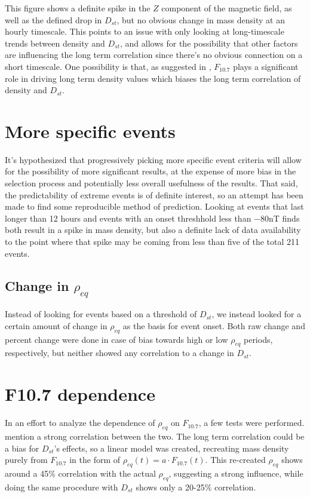 \documentclass[10pt,twocolumn]{article}
\begin{document}
This figure shows a definite spike in the $Z$ component of the magnetic field, as well as the defined drop in $D_{st}$, but no obvious change in mass density at an hourly timescale. This points to an issue with only looking at long-timescale trends between density and $D_{st}$, and allows for the possibility that other factors are influencing the long term correlation since there's no obvious connection on a short timescale. One possibility is that, as suggested in \cite{Takahashi2010}, $F_{10.7}$ plays a significant role in driving long term density values which biases the long term correlation of density and $D_{st}$.

\section{More specific events}
It's hypothesized that progressively picking more specific event criteria will allow for the possibility of more significant results, at the expense of more bias in the selection process and potentially less overall usefulness of the results. That said, the predictability of extreme events is of definite interest, so an attempt has been made to find some reproducible method of prediction. Looking at events that last longer than 12 hours and events with an onset threshhold less than $-80$nT finds both result in a spike in mass density, but also a definite lack of data availability to the point where that spike may be coming from less than five of the total 211 events. 

\subsection{Change in $\rho_{eq}$}
Instead of looking for events based on a threshold of $D_{st}$, we instead looked for a certain amount of change in $\rho_{eq}$ as the basis for event onset. Both raw change and percent change were done in case of bias towards high or low $\rho_{eq}$ periods, respectively, but neither showed any correlation to a change in $D_{st}$. 

\section{F10.7 dependence}
In an effort to analyze the dependence of $\rho_{eq}$ on $F_{10.7}$, a few tests were performed. \cite{Takahashi2010} mention a strong correlation between the two. The long term correlation could be a bias for $D_{st}$'s effects, so a linear model was created, recreating mass density purely from $F_{10.7}$ in the form of $\rho_{eq}(t)=a\cdot F_{10.7}(t)$. This re-created $\rho_{eq}$ shows around a 45\% correlation with the actual $\rho_{eq}$, suggesting a strong influence, while doing the same procedure with $D_{st}$ shows only a 20-25\% correlation. 
\end{document}
